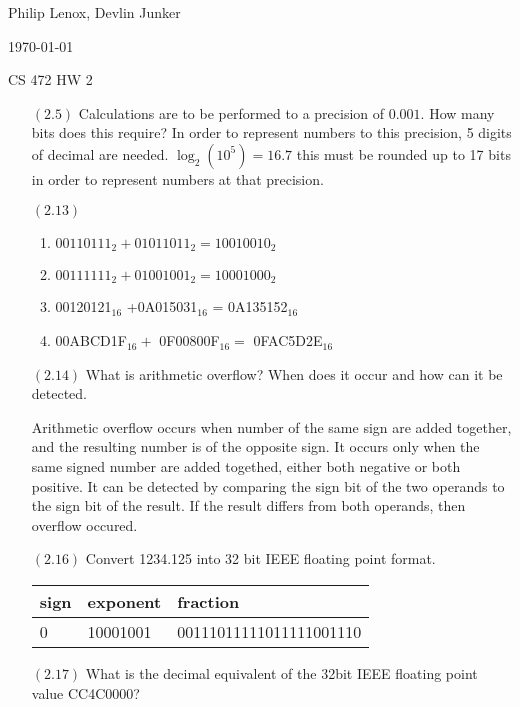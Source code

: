 \documentclass[letterpaper,10pt,titlepage]{article}
\def\name{Philip Lenox, Devlin Junker}
\begin{document}
\hfill \name

\hfill \today

\hfill CS 472 HW 2

\begin{enumerate}



\item[$(2.5)$] Calculations are to be performed to a precision of $0.001$. How many bits does this require?
In order to represent numbers to this precision, 5 digits of decimal are needed. $\log _2 \left( 10^{5} \right) = 16.7$ this must be rounded up to 17 bits in order to represent numbers at that precision.
  
\item[$(2.13)$]
\begin{enumerate}[label=\Alph*]
\item $00110111_{2} + 01011011_{2} = 10010010_{2}$ 
\item $00111111_{2} + 01001001_{2} = 10001000_{2}$
\item 00120121$_{16}$ +0A015031$_{16}$ = 0A135152$_{16}$
\item  00ABCD1F$_{16} +$ 
	   0F00800F$_{16} =$
	   0FAC5D2E$_{16}$
\end{enumerate} 


\item[$(2.14)$] What is arithmetic overflow? When does it occur and how can it be detected.

Arithmetic overflow occurs when number of the same sign are added together, and the resulting number is of the opposite sign. It occurs only when the same signed number are added togethed, either both negative or both positive. It can be detected by comparing the sign bit of the two operands to the sign bit of the result. If the result differs from both operands, then overflow occured.


\item[$(2.16)$] Convert 1234.125 into 32 bit IEEE floating point format.

    \begin{tabular}{lll}
    sign & exponent & fraction                \\
	\hline    
    0    & 10001001 & 00111011111011111001110 \\
    \end{tabular}

\item[$(2.17)$]What is the decimal equivalent of the 32bit IEEE floating point value CC4C0000?
    

\end{enumerate}
\end{document}
